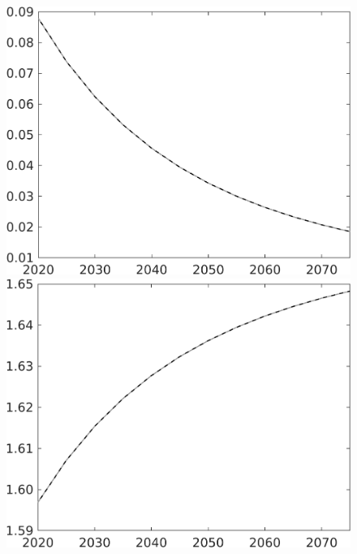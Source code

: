 \documentclass[12pt]{article}
\begin{document}
\begin{figure}[h!!]
\begin{minipage}[]{0.32\textwidth}
	\end{minipage}	
	\begin{minipage}[]{0.32\textwidth}
		\includegraphics[width=1\textwidth]{../../codding_model/own_basedOnFried/optimalPol_010922_revision/figures/all_13Sept22/CompTaul_Equlab_LFBAU_Reg0_pee_spillover0_nsk1_xgr0_knspil1_sep1_countec0_GovRev0_etaa0.79_lgd0.png}
	\end{minipage}	
	\begin{minipage}[]{0.32\textwidth}
		\includegraphics[width=1\textwidth]{../../codding_model/own_basedOnFried/optimalPol_010922_revision/figures/all_13Sept22/CompTaul_Equlab_LFBAU_Reg0_pn_spillover0_nsk1_xgr0_knspil1_sep1_countec0_GovRev0_etaa0.79_lgd0.png}

\end{minipage}
\end{figure}
\end{document}
